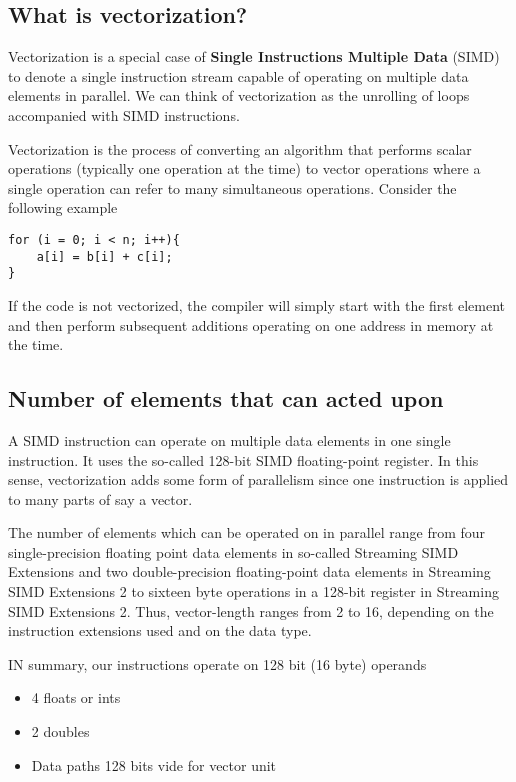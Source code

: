 \documentclass[%
oneside,                 %
final,                   %
10pt]{article}
\begin{document}
\noindent



\subsection*{What is vectorization?}
Vectorization is a special
case of \textbf{Single Instructions Multiple Data} (SIMD) to denote a single
instruction stream capable of operating on multiple data elements in
parallel. 
We can think of vectorization as the unrolling of loops accompanied with SIMD instructions.

Vectorization is the process of converting an algorithm that performs scalar operations
(typically one operation at the time) to vector operations where a single operation can refer to many simultaneous operations.
Consider the following example




\begin{verbatim}
for (i = 0; i < n; i++){
    a[i] = b[i] + c[i];
}

\end{verbatim}

If the code is not vectorized, the compiler will simply start with the first element and 
then perform subsequent additions operating on one address in memory at the time. 

\subsection*{Number of elements that can acted upon}
A SIMD instruction can operate  on multiple data elements in one single instruction.
It uses the so-called 128-bit SIMD floating-point register. 
In this sense, vectorization adds some form of parallelism since one instruction is applied  
to many parts of say a vector.

The number of elements which can be operated on in parallel
range from four single-precision floating point data elements in so-called 
Streaming SIMD Extensions and two double-precision floating-point data
elements in Streaming SIMD Extensions 2 to sixteen byte operations in
a 128-bit register in Streaming SIMD Extensions 2. Thus, vector-length
ranges from 2 to 16, depending on the instruction extensions used and
on the data type. 

IN summary, our instructions  operate on 128 bit (16 byte) operands
\begin{itemize}
\item 4 floats or ints

\item 2 doubles

\item Data paths 128 bits vide for vector unit
\end{itemize}
\end{document}
